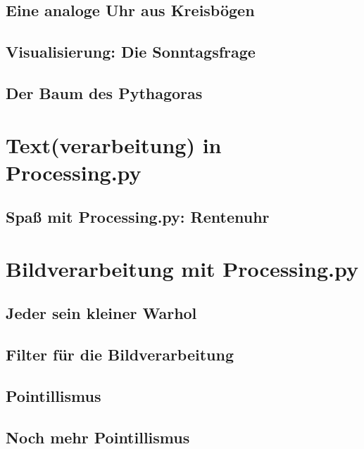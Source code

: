 \documentclass[10pt,german,]{book}
\begin{document}
\section{Eine analoge Uhr aus
Kreisbögen}\label{eine-analoge-uhr-aus-kreisbuxf6gen}

\section{Visualisierung: Die
Sonntagsfrage}\label{visualisierung-die-sonntagsfrage}

\section{Der Baum des Pythagoras}\label{der-baum-des-pythagoras}

\chapter{Text(verarbeitung) in
Processing.py}\label{textverarbeitung-in-processing.py}

\section{Spaß mit Processing.py:
Rentenuhr}\label{spauxdf-mit-processing.py-rentenuhr}

\chapter{Bildverarbeitung mit
Processing.py}\label{bildverarbeitung-mit-processing.py}

\section{Jeder sein kleiner Warhol}\label{jeder-sein-kleiner-warhol}

\section{Filter für die
Bildverarbeitung}\label{filter-fuxfcr-die-bildverarbeitung}

\section{Pointillismus}\label{pointillismus}

\section{Noch mehr Pointillismus}\label{noch-mehr-pointillismus}
\end{document}
